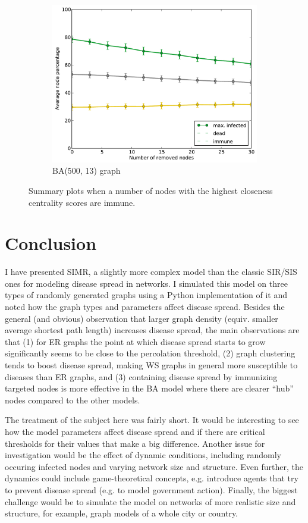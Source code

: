 \documentclass[11pt]{article} %
\begin{document}
\begin{figure}[tb]
\begin{subfigure}[b]{0.5\textwidth}
    \includegraphics[width=\textwidth]{figures/hubs_BA_500_13}
    \caption{BA(500, 13) graph}
  \end{subfigure}
  \caption{Summary plots when a number of nodes with the highest
    closeness centrality scores are immune.}
  \label{fig:hub_sum}
\end{figure}

\section{Conclusion}
I have presented SIMR, a slightly more complex model than the classic SIR/SIS
ones for modeling disease spread in networks.
I simulated this model on three types of randomly generated graphs using a
Python implementation of it and
noted how the graph types and parameters affect disease spread. Besides the
general (and obvious) observation that larger graph density (equiv. smaller average
shortest path length) increases disease spread, the main observations
are that (1) for ER graphs the point at which disease spread starts to grow
significantly seems to be close to the percolation threshold, (2) graph
clustering tends to boost disease spread, making WS graphs
in general more susceptible to diseases than ER graphs, and (3) containing
disease spread by immunizing targeted nodes is more effective in the BA
model where there are clearer ``hub'' nodes compared to the other models.

The treatment of the subject here was fairly short. It would be interesting
to see how the model parameters affect disease spread and if there are critical
thresholds for their values that make a big difference. Another issue for
investigation would be the effect of dynamic conditions, including randomly
occuring infected nodes and varying network size and structure. Even further,
the dynamics could include game-theoretical concepts, e.g. introduce agents
that try to prevent disease spread (e.g. to model government action).
Finally, the biggest challenge would be to simulate the model on networks
of more realistic size and structure, for example, graph models of a whole city
or country.



\end{document}
